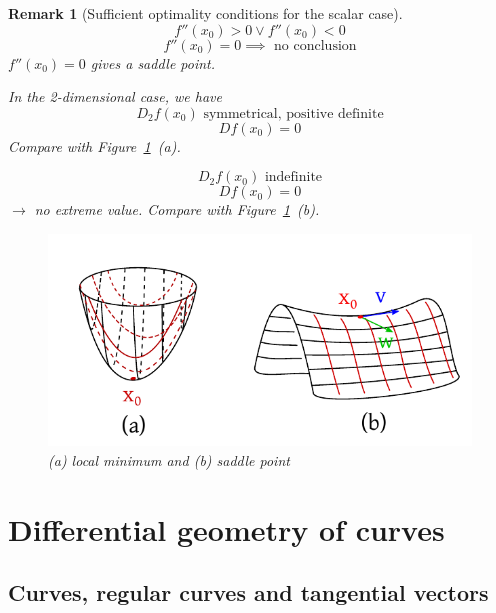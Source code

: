 \documentclass{article}
\newtheorem{remark}{Remark}  \numberwithin{remark}{section}
\begin{document}
\begin{remark}[Sufficient optimality conditions for the scalar case]
  \[ f''(x_0) > 0 \lor f''(x_0) < 0 \]
  \[ f''(x_0) = 0 \implies \text{ no conclusion} \]
  $f''(x_0) = 0$ gives a saddle point.

  In the 2-dimensional case, we have
  \[ D_2 f(x_0) \text{ symmetrical, positive definite} \]
  \[ Df(x_0) = 0 \]
  Compare with Figure~\ref{img:sad}~(a).

  \[ D_2 f(x_0) \text{ indefinite} \]
  \[ D f(x_0) = 0 \]
  $\rightarrow$ no extreme value. Compare with Figure~\ref{img:sad}~(b).

  \begin{figure}[t]
    \begin{center}
      \includegraphics{img/36b_objects.pdf}
      \caption{(a) local minimum and (b) saddle point}
      \label{img:sad}
    \end{center}
  \end{figure}
\end{remark}

\section{Differential geometry of curves}
\subsection{Curves, regular curves and tangential vectors}
\end{document}
